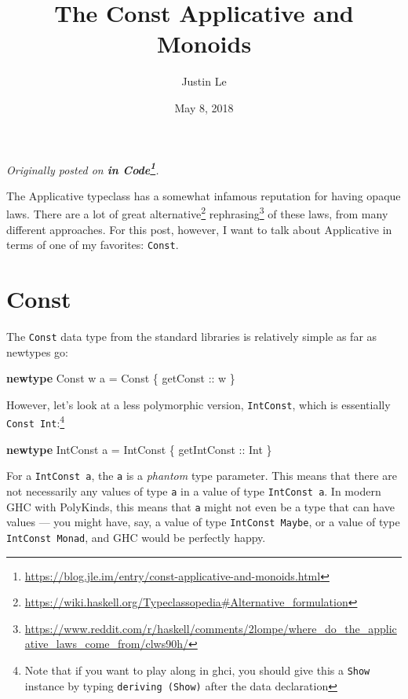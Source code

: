 \documentclass[]{article}
\title{The Const Applicative and Monoids}
\author{Justin Le}
\date{May 8, 2018}
\newenvironment{Shaded}{}{}
\newcommand{\DataTypeTok}[1]{\textcolor[rgb]{0.56,0.13,0.00}{#1}}
\newcommand{\FunctionTok}[1]{\textcolor[rgb]{0.02,0.16,0.49}{#1}}
\newcommand{\KeywordTok}[1]{\textcolor[rgb]{0.00,0.44,0.13}{\textbf{#1}}}
\newcommand{\NormalTok}[1]{#1}
\newcommand{\OtherTok}[1]{\textcolor[rgb]{0.00,0.44,0.13}{#1}}
\renewcommand{\href}[2]{#2\footnote{\url{#1}}}
\begin{document}
\maketitle

\emph{Originally posted on
\textbf{\href{https://blog.jle.im/entry/const-applicative-and-monoids.html}{in
Code}}.}

The Applicative typeclass has a somewhat infamous reputation for having opaque
laws. There are a lot of great
\href{https://wiki.haskell.org/Typeclassopedia\#Alternative_formulation}{alternative}
\href{https://www.reddit.com/r/haskell/comments/2lompe/where_do_the_applicative_laws_come_from/clws90h/}{rephrasing}
of these laws, from many different approaches. For this post, however, I want to
talk about Applicative in terms of one of my favorites: \texttt{Const}.

\hypertarget{const}{%
\section{Const}\label{const}}

The \texttt{Const} data type from the standard libraries is relatively simple as
far as newtypes go:

\begin{Shaded}
\begin{Highlighting}[]
\KeywordTok{newtype} \DataTypeTok{Const}\NormalTok{ w a }\FunctionTok{=} \DataTypeTok{Const}\NormalTok{ \{}\OtherTok{ getConst ::}\NormalTok{ w \}}
\end{Highlighting}
\end{Shaded}

However, let's look at a less polymorphic version, \texttt{IntConst}, which is
essentially \texttt{Const\ Int}:\footnote{Note that if you want to play along in
  ghci, you should give this a \texttt{Show} instance by typing
  \texttt{deriving\ (Show)} after the data declaration}

\begin{Shaded}
\begin{Highlighting}[]
\KeywordTok{newtype} \DataTypeTok{IntConst}\NormalTok{ a }\FunctionTok{=} \DataTypeTok{IntConst}\NormalTok{ \{}\OtherTok{ getIntConst ::} \DataTypeTok{Int}\NormalTok{ \}}
\end{Highlighting}
\end{Shaded}

For a \texttt{IntConst\ a}, the \texttt{a} is a \emph{phantom} type parameter.
This means that there are not necessarily any values of type \texttt{a} in a
value of type \texttt{IntConst\ a}. In modern GHC with PolyKinds, this means
that \texttt{a} might not even be a type that can have values --- you might
have, say, a value of type \texttt{IntConst\ Maybe}, or a value of type
\texttt{IntConst\ Monad}, and GHC would be perfectly happy.
\end{document}
